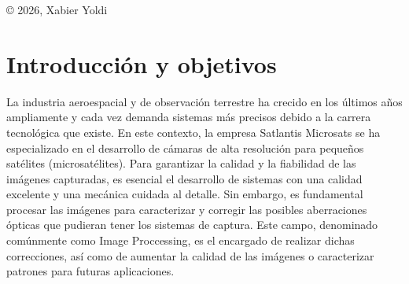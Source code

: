\documentclass[12pt]{article}
\numberwithin{equation}{section}%
\newcommand{\lightit}[1]{{\lightitfont #1}}
\begin{document}
\begin{titlepage}
\begin{center}
{    \parbox{11cm}{
         \begin{center}
    \footnotesize © 2026, Xabier Yoldi

        \end{center}
    }
    }
\end{center}

\hspace{-3.2cm}
\noindent{}
\end{titlepage}



\pagestyle{fancy}

\fancyhead[L]{\nouppercase{\leftmark}}
\tableofcontents
\newpage

\section{Introducción y objetivos}

La industria aeroespacial y de observación terrestre ha crecido en los últimos años ampliamente y cada vez demanda sistemas más precisos debido a la carrera tecnológica que existe. En este contexto, la empresa Satlantis Microsats se ha especializado en el desarrollo de cámaras de alta resolución para pequeños satélites (microsatélites). Para garantizar la calidad y la fiabilidad de las imágenes capturadas, es esencial el desarrollo de sistemas con una calidad excelente y una mecánica cuidada al detalle. Sin  embargo, es fundamental procesar las imágenes para caracterizar y corregir las posibles aberraciones ópticas que pudieran tener los sistemas de captura. Este campo, denominado comúnmente como \lightit{Image Proccessing}, es el encargado de realizar dichas correcciones, así como de aumentar la calidad de las imágenes o caracterizar patrones para futuras aplicaciones.\\
\end{document}
